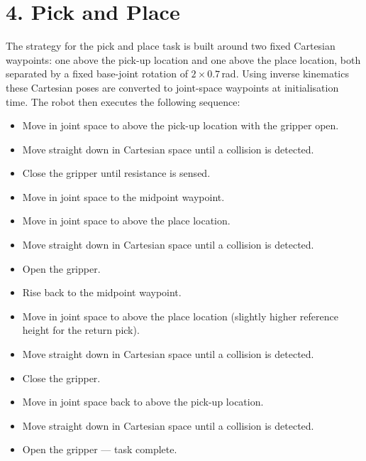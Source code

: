 \documentclass[12pt,a4paper]{article}
\begin{document}
\section*{4. Pick and Place}

The strategy for the pick and place task is built around two fixed Cartesian waypoints:
one above the pick-up location and one above the place location, both separated by a fixed
base-joint rotation of $2 \times 0.7$\,rad.  Using inverse kinematics these Cartesian poses
are converted to joint-space waypoints at initialisation time.  The robot then executes the
following sequence:

\begin{itemize}
    \item Move in joint space to above the pick-up location with the gripper open.

    \item Move straight down in Cartesian space until a collision is detected.

    \item Close the gripper until resistance is sensed.

    \item Move in joint space to the midpoint waypoint.

    \item Move in joint space to above the place location.

    \item Move straight down in Cartesian space until a collision is detected.

    \item Open the gripper.

    \item Rise back to the midpoint waypoint.

    \item Move in joint space to above the place location (slightly higher reference height
          for the return pick).

    \item Move straight down in Cartesian space until a collision is detected.

    \item Close the gripper.

    \item Move in joint space back to above the pick-up location.

    \item Move straight down in Cartesian space until a collision is detected.

    \item Open the gripper --- task complete.
\end{itemize}
\end{document}
